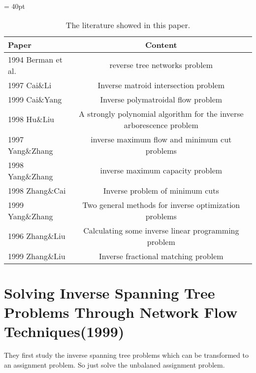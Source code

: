 \documentclass[UTF8]{article}
\begin{document}
\begin{table}[ht]

 \tabcolsep = 40pt

 \small\renewcommand{}

 \caption{The literature showed in this paper.\label{tab:1}}

 {\begin{tabular}{lc}
   \hline
   Paper              & Content                                                              \\
   \hline
   1994 Berman et al. & reverse tree networks problem                                        \\
   \hline
   1997 Cai\&Li       & Inverse matroid intersection problem                                 \\
   \hline
   1999 Cai\&Yang     & Inverse polymatroidal flow problem                                   \\
   \hline
   1998 Hu\&Liu       & A strongly polynomial algorithm for the inverse arborescence problem \\
   \hline
   1997 Yang\&Zhang   & inverse maximum flow and minimum cut problems                        \\
   \hline
   1998 Yang\&Zhang   & inverse maximum capacity problem                                     \\
   \hline
   1998 Zhang\&Cai    & Inverse problem of minimum cuts                                      \\
   \hline
   1999 Yang\&Zhang   & Two general methods for inverse optimization problems                \\
   \hline
   1996 Zhang\&Liu    & Calculating some inverse linear programming problem                  \\
   \hline
   1999 Zhang\&Liu    & Inverse fractional matching problem                                  \\
   \hline
  \end{tabular}}
 {}
\end{table}


\section{Solving Inverse Spanning Tree Problems Through Network Flow Techniques(1999)}

They ﬁrst study the inverse spanning tree problems which can be transformed to an assignment problem. So just solve the unbalaned assignment problem.
\end{document}
